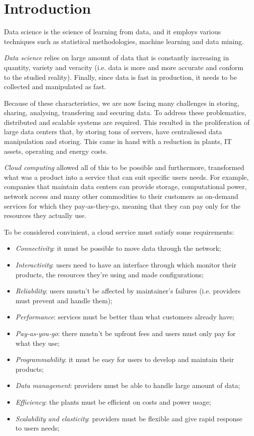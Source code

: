 \chapter{Introduction}
\begin{definition}
    Data science is the science of learning from data, and it employs various
    techniques such as statistical methodologies, machine learning and data
    mining.
\end{definition}\noindent
\emph{Data science} relies on large amount of data that is constantly increasing
in quantity, variety and veracity (i.e. data is more and more accurate and
conform to the studied reality). Finally, since data is fast in production, it
needs to be collected and manipulated as fast.

Because of these characteristics, we are now facing many challenges in storing,
sharing, analysing, transfering and securing data. To address these problematics,
distributed and scalable systems are required. This resulted in the proliferation
of large data centers that, by storing tons of servers, have centraliesed data
manipulation and storing. This came in hand with a reduction in plants, IT
assets, operating and energy costs.

\emph{Cloud computing} allowed all of this to be possible and furthermore,
transformed what was a product into a service that can suit specific users
needs. For example, companies that maintain data centers can provide storage,
computational power, network access and many other commodities to their
customers as on-demand services for which they pay-as-they-go, meaning that
they can pay only for the resources they actually use.

To be considered convinient, a cloud service must satisfy some requirements:
\begin{itemize}
    \item\emph{Connectivity}: it must be possible to move data through the
    network;
    \item\emph{Interactivity}: users need to have an interface through which
    monitor their products, the resources they're using and made configurations;
    \item\emph{Reliability}: users mustn't be affected by maintainer's failures
    (i.e. providers must prevent and handle them);
    \item\emph{Performance}: services must be better than what customers already
    have;
    \item\emph{Pay-as-you-go}: there mustn't be upfront fees and users must only
    pay for what they use;
    \item\emph{Programmability}: it must be easy for users to develop and maintain
    their products;
    \item\emph{Data management}: providers must be able to handle large amount
    of data;
    \item\emph{Efficiency}: the plants must be efficient on costs and power usage;
    \item\emph{Scalability and elasticity}: providers must be flexible and give
    rapid response to users needs;
\end{itemize}


